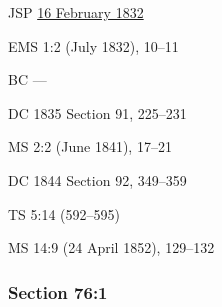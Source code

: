 		\begin{compactdesc}
			\item[JSP] \hyperref[EMS-1832-JS-16-FEB-1832]{16 February 1832}
			\item[EMS] 1:2 (July 1832), 10--11
			\item[BC] ---
			\item[DC 1835] Section 91, 225--231
			\item[MS] 2:2 (June 1841), 17--21
			\item[DC 1844] Section 92, 349--359
			\item[TS] 5:14 (592--595)
			\item[MS] 14:9 (24 April 1852), 129--132
		\end{compactdesc}

	\subsubsection{Section 76:1} %
		\label{DC76-1}

